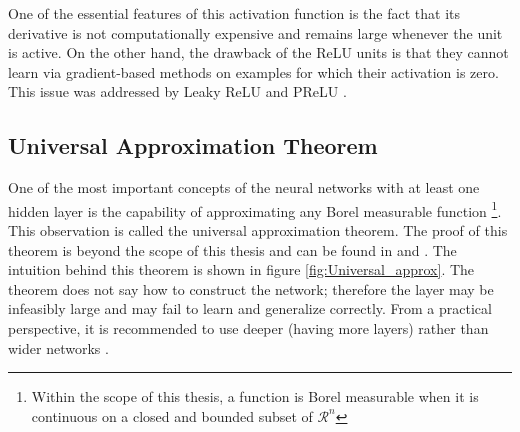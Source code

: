 One of the essential features of this activation function is the fact that its derivative is not computationally expensive and remains large whenever the unit is active. On the other hand, the drawback of the ReLU units is that they cannot learn via gradient-based methods on examples for which their activation is zero.
This issue was addressed by Leaky ReLU \cite{LeakyReLU} and PReLU \cite{PReLU}. 

\subsection{Universal Approximation Theorem}

One of the most important concepts of the neural networks with at least one hidden layer is the capability of approximating any Borel measurable function \footnote{Within the scope of this thesis, a function is Borel measurable when it is continuous on a closed and bounded subset of $\mathcal{R}^{n}$}. This observation is called the universal approximation theorem. The proof of this theorem is beyond the scope of this thesis and can be found in  \cite{Universal_approx_1} and \cite{Universal_approx_2}. The intuition behind this theorem is shown in figure \ref{fig:Universal_approx}.
The theorem does not say how to construct the network; therefore the layer may be infeasibly large and may fail to learn and generalize correctly. From a practical perspective, it is recommended to use deeper (having more layers) rather than wider networks \cite{Relu_regions}. 

